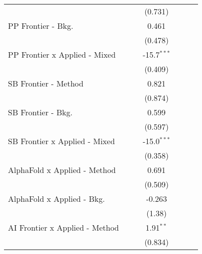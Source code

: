 \begin{tabular}{lcccccc}
                                  &               &               & (0.731)       &               &        &   \\   
   PP Frontier - Bkg.             &               &               & 0.461         &               &        &   \\   
                                  &               &               & (0.478)       &               &        &   \\   
   PP Frontier x Applied - Mixed  &               &               & -15.7$^{***}$ &               &        &   \\   
                                  &               &               & (0.409)       &               &        &   \\   
   SB Frontier - Method           &               &               & 0.821         &               &        &   \\   
                                  &               &               & (0.874)       &               &        &   \\   
   SB Frontier - Bkg.             &               &               & 0.599         &               &        &   \\   
                                  &               &               & (0.597)       &               &        &   \\   
   SB Frontier x Applied - Mixed  &               &               & -15.0$^{***}$ &               &        &   \\   
                                  &               &               & (0.358)       &               &        &   \\   
   AlphaFold x Applied - Method   &               &               & 0.691         &               &        &   \\   
                                  &               &               & (0.509)       &               &        &   \\   
   AlphaFold x Applied - Bkg.     &               &               & -0.263        &               &        &   \\   
                                  &               &               & (1.38)        &               &        &   \\   
   AI Frontier x Applied - Method &               &               & 1.91$^{**}$   &               &        &   \\   
                                  &               &               & (0.834)       &               &        &   \\   

\end{tabular}
